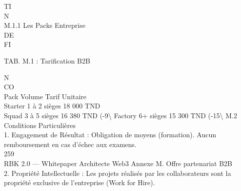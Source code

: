 \documentclass[12pt,landscape,a4paper]{article}
\begin{document}
\vspace{0.5em}
\vspace{0.5em}
\vspace{0.5em}
TI\\
N\\
M.1.1 Les Packs Entreprise\\
\vspace{0.5em}
\vspace{0.5em}
\vspace{0.5em}
\vspace{0.5em}
DE\\
FI\\
\begin{center}\begin{tabular}TAB. M.1 : Tarification B2B\end{tabular}\end{center}
\vspace{0.5em}
\vspace{0.5em}
\vspace{0.5em}
N\\
CO\\
Pack      Volume         Tarif Unitaire\\
Starter 1 à 2 sièges 18 000 TND\\
Squad     3 à 5 sièges 16 380 TND (-9\textbackslash{}%
Factory 6+ sièges        15 300 TND (-15\textbackslash{}%
\vspace{0.5em}
\vspace{0.5em}
\vspace{0.5em}
\vspace{0.5em}
M.2 Conditions Particulières\\
1. Engagement de Résultat : Obligation de moyens (formation). Aucun remboursement en cas d’échec aux examens.\\
\vspace{0.5em}
\vspace{0.5em}
\vspace{0.5em}
259\\
RBK 2.0 — Whitepaper Architecte Web3                                                                                              Annexe M. Offre partenariat B2B\\
\vspace{0.5em}
\vspace{0.5em}
2. Propriété Intellectuelle : Les projets réalisés par les collaborateurs sont la propriété exclusive de l’entreprise (Work for Hire).\\
\end{document}
